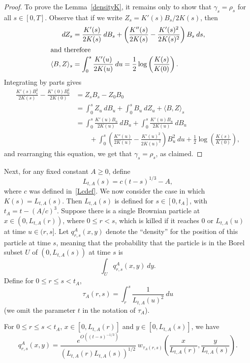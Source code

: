 \documentclass[10pt]{amsart}
\theoremstyle{definition}\newtheorem{defi}[theo]{Definition}\newtheorem{rema}[theo]{Remark}\newtheorem{exam}[theo]{Example}\newtheorem{exem}[theo]{Example}\newtheorem{nota}[theo]{Notation}
\newcommand{\1} {\mathds{1}}
\begin{document}
\begin{proof}
To prove the Lemma~\ref{densityK}, it remains only to show that $\gamma_s = \rho_s$ for all $s \in [0, T]$. Observe that if we write $Z_s = K'(s)B_s/2K(s)$, then
\begin{align*}
dZ_s &= \frac{K'(s)}{2K(s)} \: dB_s + \left(\frac{K''(s)}{2K(s)} - \frac{K'(s)^2}{2K(s)^2} \right) B_s \: ds,
\\
\intertext{and therefore}
\langle B, Z \rangle_s &= \int_0^s \frac{K'(u)}{2K(u)} \: du = \frac{1}{2} \log \left(\frac{K(s)}{K(0)} \right).
\end{align*}
Integrating by parts gives
\begin{align*}
\frac{K'(s) B_s^2}{2K(s)} - \frac{K'(0)B_0^2}{2K(0)} &= Z_sB_s-Z_0B_0 \\
&= \int_0^sZ_u \: dB_u + \int_0^s B_u \: dZ_u + \langle B, Z \rangle_s\\
&= \int_0^s \frac{K'(u) B_u}{2K(u)} \: dB_u + \int_0^s \frac{K'(u)B_u}{2K(u)} \: dB_u \\
&\qquad+ \int_0^s \left(\frac{K''(u)}{2K(u)} - \frac{K'(u)^2}{2K(u)^2} \right) B_u^2 \: du + \frac{1}{2} \log \left(\frac{K(s)}{K(0)} \right),
\end{align*}
and rearranging this equation, we get that $\gamma_s = \rho_s$, as claimed.
\end{proof}

Next, for any fixed constant $A \geq 0$, define
\begin{equation}\label{LAdef}
L_{t,A}(s) = c(t - s)^{1/3} - A,
\end{equation}
where $c$ was defined in~\eqref{Lcdef}.
We now consider the case in which $K(s) = L_{t,A}(s)$. Then $L_{t,A}(s)$ is defined for $s \in [0,t_A]$, with $t_A = t - (A/c)^3$. Suppose there is a single Brownian particle at $x \in (0, L_{t,A}(r))$, where $0 \leq r < s$, which is killed if it reaches $0$ or $L_{t,A}(u)$ at time $u \in (r, s]$. Let $q_{r,s}^A(x,y)$ denote the ``density'' for the position of this particle at time $s$, meaning that the probability that the particle is in the Borel subset $U$ of $(0, L_{t,A}(s))$ at time $s$ is
\[
\int_U q_{r,s}^A(x,y) \: dy.
\]
Define for $0\le r\le s < t_A$,
\begin{equation}\label{taursdef}
\tau_A(r,s) = \int_r^s \frac{1}{L_{t,A}(u)^2} \: du
\end{equation}
(we omit the parameter $t$ in the notation of $\tau_A$).

\begin{prop}\label{prop:qrs}
For $0\le r\le s< t_A$, $x\in[0,L_{t,A}(r)]$ and $y\in[0,L_{t,A}(s)]$, we have
\[
q_{r,s}^A(x,y) = \frac{e^{O\left((t-s)^{-1/3}\right)}}{\left(L_{t,A}(r) L_{t,A}(s)\right)^{1/2}} \: w_{\tau_A(r,s)} \left(\frac{x}{L_{t,A}(r)}, \frac{y}{L_{t,A}(s)} \right).
\]
\end{prop}
\end{document}
